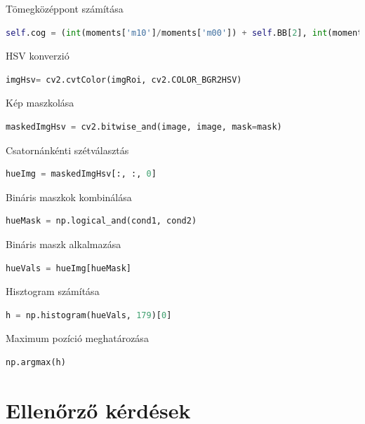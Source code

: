 \documentclass[12pt,a4paper,oneside]{report}             %
\begin{document}
Tömegközéppont számítása

\begin{lstlisting}[language=Python]
self.cog = (int(moments['m10']/moments['m00']) + self.BB[2], int(moments['m01']/moments['m00']) + self.BB[0])
\end{lstlisting}

HSV konverzió

\begin{lstlisting}[language=Python]
imgHsv= cv2.cvtColor(imgRoi, cv2.COLOR_BGR2HSV)
\end{lstlisting}

Kép maszkolása

\begin{lstlisting}[language=Python]
maskedImgHsv = cv2.bitwise_and(image, image, mask=mask)
\end{lstlisting}

Csatornánkénti szétválasztás

\begin{lstlisting}[language=Python]
hueImg = maskedImgHsv[:, :, 0]
\end{lstlisting}

Bináris maszkok kombinálása

\begin{lstlisting}[language=Python]
hueMask = np.logical_and(cond1, cond2)
\end{lstlisting}

Bináris maszk alkalmazása

\begin{lstlisting}[language=Python]
hueVals = hueImg[hueMask]
\end{lstlisting}

Hisztogram számítása

\begin{lstlisting}[language=Python]
h = np.histogram(hueVals, 179)[0]
\end{lstlisting}

Maximum pozíció meghatározása

\begin{lstlisting}[language=Python]
np.argmax(h) 
\end{lstlisting}


\chapter{Ellenőrző kérdések}
\end{document}
